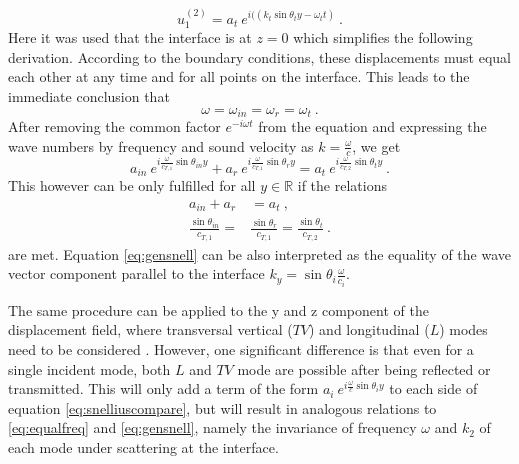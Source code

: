 \begin{equation}
    u_1^{(2)} = a_{t}\
    e^{i(( k_{t}\sin\theta_{t} y -\omega_{t} t)} \ .
\end{equation}
Here it was used that the interface is at $z=0$ which simplifies the following
derivation.
According to the boundary conditions, these displacements must equal each other
at any time and for all points on the interface. This leads to the immediate
conclusion that
\begin{equation} \label{eq:equalfreq}
    \omega = \omega_{in} = \omega_r = \omega_t \ .
\end{equation}
After removing the common factor $e^{-i\omega t}$ from the equation and
expressing the wave numbers by frequency and sound velocity as
$k = \frac{\omega}{c}$, we get
\begin{equation} \label{eq:snelliuscompare}
    a_{in}\ e^{i \frac{ \omega}{c_{T,1}}\sin\theta_{in} y}
    + a_{r}\ e^{i \frac{ \omega}{c_{T,1}}\sin\theta_{r} y}
    = a_{t}\ e^{i \frac{ \omega}{c_{T,2}}\sin\theta_{t} y} \ .
\end{equation}
This however can be only fulfilled for all $y \in \mathbb{R}$ if the relations
\begin{align}
    a_{in} + a_r                      & = a_t                     \ ,       \\
    \frac{\sin\theta_{in}}{c_{T,1}} = & \frac{\sin\theta_{r}}{c_{T,1}} =
    \frac{\sin\theta_{t}}{c_{T,2}} \label{eq:gensnell} \ .
\end{align}
are met. Equation \ref{eq:gensnell} can be also interpreted as the equality
of the wave vector component parallel to the interface
$k_y=\sin\theta_i \frac{\omega}{c_i}$.

The same procedure can be applied to the y and z component of the displacement
field, where transversal vertical ($TV$) and longitudinal ($L$) modes need to
be considered \cite[185]{achenbach1973wave}. However, one significant
difference is that even for a single incident mode, both $L$ and $TV$ mode are
possible after being reflected or transmitted. This will only add a term of the
form $ a_{i}\ e^{i \frac{ \omega}{c}\sin\theta_{i} y}$ to each side of equation
\ref{eq:snelliuscompare}, but will result in analogous relations to
\ref{eq:equalfreq} and \ref{eq:gensnell}, namely the invariance of frequency
$\omega$ and $k_2$ of each mode under scattering at the interface.


